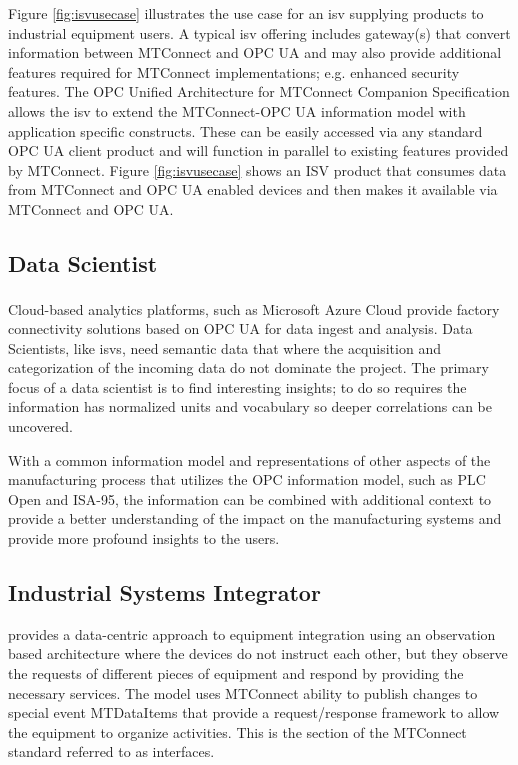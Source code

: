 Figure \ref{fig:isvusecase} illustrates the use case for an \gls{isv} supplying products to industrial equipment users. A typical \gls{isv} offering includes gateway(s) that convert information between MTConnect and OPC UA and may also provide additional features required for MTConnect implementations; e.g. enhanced security features. The OPC Unified Architecture for MTConnect Companion Specification allows the \gls{isv} to extend the MTConnect-OPC UA information model with application specific constructs. These can be easily accessed via any standard OPC UA client product and will function in parallel to existing features provided by MTConnect. Figure \ref{fig:isvusecase} shows an ISV product that consumes data from MTConnect and OPC UA enabled devices and then makes it available via MTConnect and OPC UA.


\FloatBarrier

\subsection{Data Scientist}

Cloud-based analytics platforms, such as Microsoft Azure\textsuperscript{\textregistered} Cloud provide factory connectivity solutions based on OPC UA for data ingest and analysis. Data Scientists, like \glspl{isv}, need semantic data that where the acquisition and categorization of the incoming data do not dominate the project. The primary focus of a data scientist is to find interesting insights; to do so requires the information has normalized units and vocabulary so deeper correlations can be uncovered. 

With a common information model and representations of other aspects of the manufacturing process that utilizes the OPC information model, such as PLC Open and ISA-95, the information can be combined with additional context to provide a better understanding of the impact on the manufacturing systems and provide more profound insights to the users.

\FloatBarrier

\subsection{Industrial Systems Integrator}

\cite{MTCPart5} provides a data-centric approach to equipment integration using an observation based architecture where the devices do not instruct each other, but they observe the requests of different pieces of equipment and respond by providing the necessary services. The model uses MTConnect ability to publish changes to special event \glspl{MTDataItem} that provide a request/response framework to allow the equipment to organize activities. This is the section of the MTConnect standard referred to as \gls{interfaces}.

